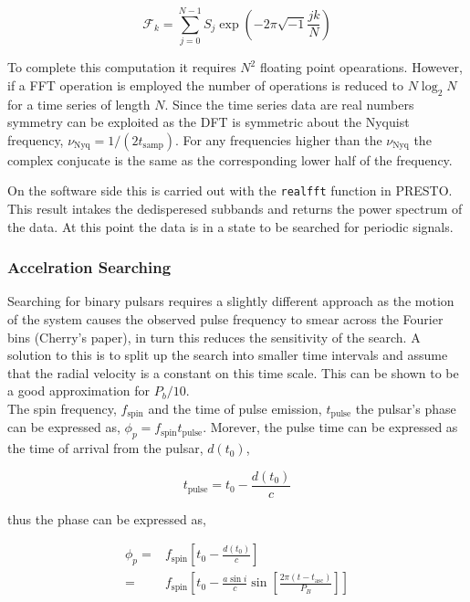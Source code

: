 \begin{equation}
    \mathcal{F}_k = \sum_{j=0}^{N-1} S_j \exp\left(-2\pi \sqrt{-1} \frac{jk}{N}\right)
\end{equation}

To complete this computation it requires $N^2$ floating point opearations. However, if a FFT operation is employed the number of operations is reduced to $N \log_2 N$ for a time series of length $N$. Since the time series data are real numbers symmetry can be exploited as the DFT is symmetric about the Nyquist frequency, $\nu_{\text{Nyq}} = 1/(2 t_{\text{samp}})$. For any frequencies higher than the $\nu_{\text{Nyq}}$ the complex conjucate is the same as the corresponding lower half of the frequency.

On the software side this is carried out with the \texttt{realfft} function in PRESTO. This result intakes the dedisperesed subbands and returns the power spectrum of the data. At this point the data is in a state to be searched for periodic signals.

\subsubsection{Accelration Searching}

Searching for binary pulsars requires a slightly different approach as the motion of the system causes the observed pulse frequency to smear across the Fourier bins (Cherry's paper), in turn this reduces the sensitivity of the search. A solution to this is to split up the search into smaller time intervals and assume that the radial velocity is a constant on this time scale. This can be shown to be a good approximation for $P_b/10$. \\ 
The spin frequency, $f_{\text{spin}}$ and the time of pulse emission, $t_{\text{pulse}}$ the pulsar's phase can be expressed as, $\phi_p = f_{\text{spin}}t_{\text{pulse}}$. Morever, the pulse time can be expressed as the time of arrival from the pulsar, $d(t_0)$, 

\begin{equation}
    t_{\text{pulse}} = t_0 - \frac{d(t_0)}{c}
\end{equation}

thus the phase can be expressed as,

\begin{align}
    \phi_p = & f_{\text{spin}}\left[ t_0 - \frac{d(t_0)}{c}\right] \\ 
    = & f_\text{spin} \left[ t_0 - \frac{a \sin i}{c} \sin \left[ \frac{2 \pi (t - t_{\text{asc}})}{P_B} \right] \right]
\end{align}

